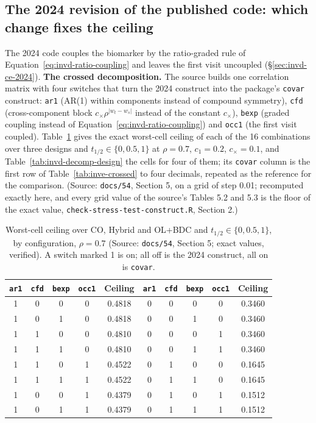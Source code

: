 \documentclass[11pt]{article}
\newcommand{\code}[1]{\texttt{#1}}
\begin{document}
\subsection{The 2024 revision of the published code: which change fixes
the ceiling}
\label{sec:invd-ce-2024-fix}

The 2024 code couples the biomarker by the ratio-graded rule of
Equation~\eqref{eq:invd-ratio-coupling} and leaves the first visit
uncoupled (\S\ref{sec:invd-ce-2024}).
\textbf{The crossed decomposition.} The source builds one correlation
matrix with four switches that turn the 2024 construct into the
package's \code{covar} construct: \code{ar1} (AR(1) within components
instead of compound symmetry), \code{cfd} (cross-component block
$c_\times\rho^{|w_t-w_s|}$ instead of the constant $c_\times$),
\code{bexp} (graded coupling instead of
Equation~\eqref{eq:invd-ratio-coupling}) and \code{occ1} (the first
visit coupled). Table~\ref{tab:invd-decomp} gives the exact worst-cell
ceiling of each of the 16 combinations over three designs and
$t_{1/2} \in \{0, 0.5, 1\}$ at $\rho = 0.7$, $c_1 = 0.2$,
$c_\times = 0.1$, and Table~\ref{tab:invd-decomp-design} the cells for
four of them; its \code{covar} column is the first row of
Table~\ref{tab:inve-crossed} to four decimals, repeated as the
reference for the comparison. (Source: \code{docs/54}, Section 5,
on a grid of step 0.01; recomputed exactly here, and every grid value
of the source's Tables 5.2 and 5.3 is the floor of the exact value,
\code{check-stress-test-construct.R}, Section 2.)

\begin{table}[h]
\centering\small
\caption{Worst-cell ceiling over CO, Hybrid and OL+BDC and
$t_{1/2} \in \{0, 0.5, 1\}$, by configuration, $\rho = 0.7$ (Source:
\code{docs/54}, Section 5; exact values,
verified). A switch marked 1 is on; all off is the 2024 construct, all
on is \code{covar}.}
\label{tab:invd-decomp}
\begin{tabular}{@{}cccccccccc@{}}
\toprule
\code{ar1} & \code{cfd} & \code{bexp} & \code{occ1} & Ceiling &
\code{ar1} & \code{cfd} & \code{bexp} & \code{occ1} & Ceiling \\
\midrule
1 & 0 & 0 & 0 & 0.4818 & 0 & 0 & 0 & 0 & 0.3460 \\
1 & 0 & 1 & 0 & 0.4818 & 0 & 0 & 1 & 0 & 0.3460 \\
1 & 1 & 0 & 0 & 0.4810 & 0 & 0 & 0 & 1 & 0.3460 \\
1 & 1 & 1 & 0 & 0.4810 & 0 & 0 & 1 & 1 & 0.3460 \\
1 & 1 & 0 & 1 & 0.4522 & 0 & 1 & 0 & 0 & 0.1645 \\
1 & 1 & 1 & 1 & 0.4522 & 0 & 1 & 1 & 0 & 0.1645 \\
1 & 0 & 0 & 1 & 0.4379 & 0 & 1 & 0 & 1 & 0.1512 \\
1 & 0 & 1 & 1 & 0.4379 & 0 & 1 & 1 & 1 & 0.1512 \\
\bottomrule
\end{tabular}
\end{table}
\end{document}
